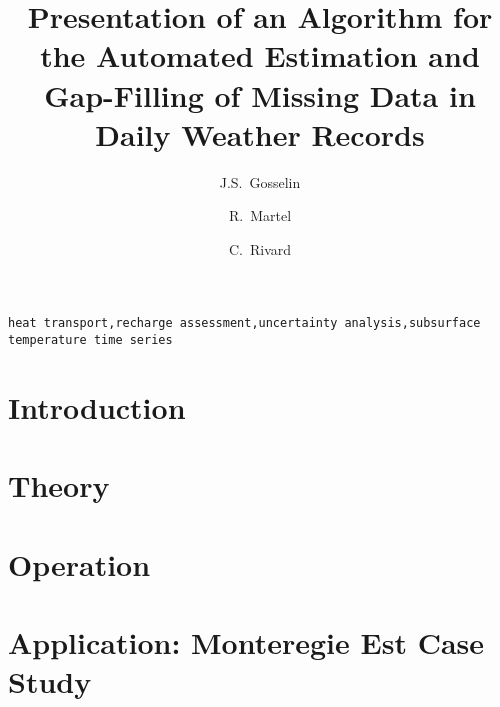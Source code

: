\documentclass[3p, times, review]{elsarticle} %
\begin{document}
\begin{frontmatter}

\title{Presentation of an Algorithm for the Automated Estimation and Gap-Filling of Missing Data in Daily Weather Records}

\author[inrs]{J.S.~Gosselin}

\author[inrs]{R.~Martel}

\author[cgc]{C.~Rivard}


\address[inrs]{Institut national de la recherche scientifique, Centre Eau Terre Environnement,
490 rue de la Couronne, Quebec City, Quebec, Canada}
\address[cgc]{Geological Survey of Canada, Quebec Division, 490 rue de la Couronne, Quebec City, Quebec, Canada}

\begin{abstract}
	\vspace{-1em}
	
\end{abstract}

\begin{keyword}
\texttt{heat transport\sep recharge assessment\sep uncertainty analysis\sep subsurface temperature time series}
\end{keyword}

\end{frontmatter}

\linenumbers

\section{Introduction}
    

\section{Theory}\label{sec:Theory}
    
    
\section{Operation}\label{sec:Howto}
    
    
\section{Application: Monteregie Est Case Study}\label{sec:MontEstCaseStudy}
    
    
\end{document}
